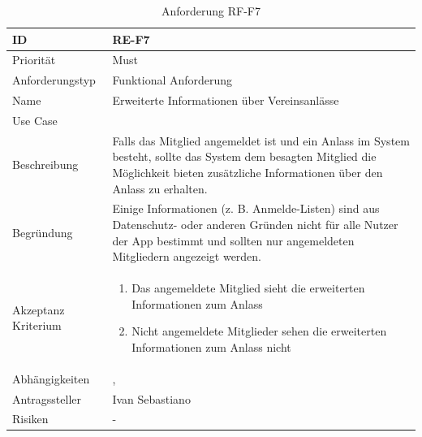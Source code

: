 \begin{table}[ht]
\centering
  \begin{tabular}{ l | p{8cm} }
	\hline
	\rowcolor{gray}
	ID 			&	\textbf{RE-F7}\\ \hline
	Priorität 		&	Must\\ \hline
	Anforderungstyp	&	Funktional Anforderung\\ \hline
	Name 			&	Erweiterte Informationen über Vereinsanlässe\\ \hline
	Use Case 		&	\nameref{table:use_case_5}\\ \hline
	Beschreibung 	&	Falls das Mitglied angemeldet ist und ein Anlass im System besteht, sollte das System dem besagten Mitglied die Möglichkeit bieten zusätzliche Informationen über den Anlass zu erhalten.\\ \hline
	Begründung 		&	Einige Informationen (z. B. Anmelde-Listen) sind aus Datenschutz- oder anderen Gründen nicht für alle Nutzer der App bestimmt und sollten nur angemeldeten Mitgliedern angezeigt werden.\\ \hline
	Akzeptanz Kriterium	&	\begin{enumerate}
					\item Das angemeldete Mitglied sieht die erweiterten Informationen zum Anlass
					\item Nicht angemeldete Mitglieder sehen die erweiterten Informationen zum Anlass nicht
					\end{enumerate}
					\\ \hline
	Abhängigkeiten 	&	\nameref{table:req_1}, \nameref{table:req_6}\\ \hline
	Antragssteller 	&	Ivan Sebastiano\\ \hline
	Risiken	 	&	-
  \end{tabular}
   \caption{Anforderung RF-F7}\label{table:req_7}
\end{table}

